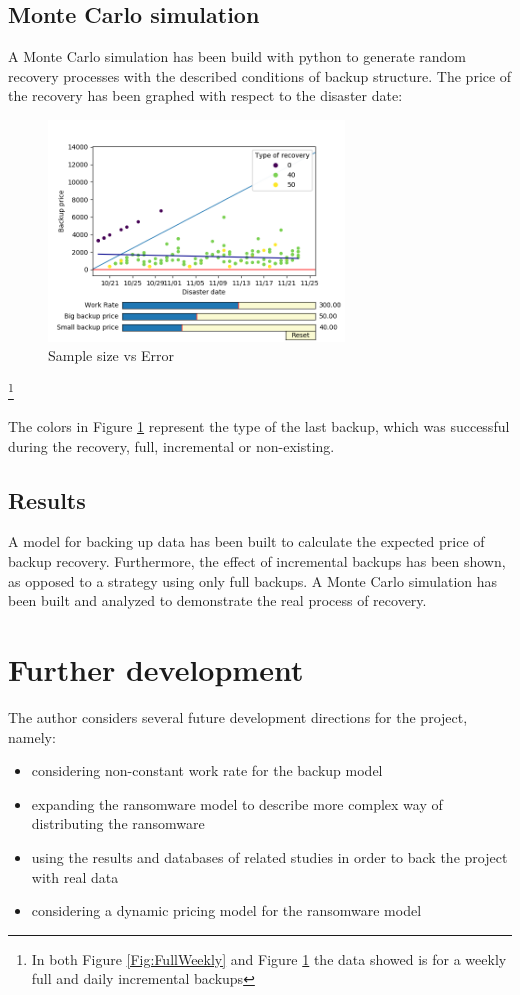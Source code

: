 \documentclass[11pt, a4paper]{article}
\theoremstyle{definition}
\newcommand\blfootnote[1]{%
	\begingroup
	\renewcommand\thefootnote{}\footnote{#1}%
	\addtocounter{footnote}{-1}%
	\endgroup
}
\begin{document}
		\subsection{Monte Carlo simulation}
			A Monte Carlo simulation has been build with python to generate random recovery processes with the described conditions of backup structure. The price of the recovery has been graphed with respect to the disaster date:
			\begin{figure}[H]
				\begin{minipage}{1.0\textwidth}
					\centering
					\includegraphics[width=0.7\textwidth]{"Weekly_full_carlo"}
					\caption{Sample size vs Error}\label{Fig:MonteCarlo}
				\end{minipage}
			\end{figure}
		\blfootnote{In both Figure \ref{Fig:FullWeekly} and Figure \ref{Fig:MonteCarlo} the data showed is for a weekly full and daily incremental backups}
		The colors in Figure \ref{Fig:MonteCarlo} represent the type of the last backup, which was successful during the recovery, full, incremental or non-existing.
		\subsection{Results}
			A model for backing up data has been built to calculate the expected price of backup recovery. Furthermore, the effect of incremental backups has been shown, as opposed to a strategy using only full backups. A Monte Carlo simulation has been built and analyzed to demonstrate the real process of recovery.
\section{Further development}
	The author considers several future development directions for the project, namely:
	\begin{itemize}
		\item considering non-constant work rate for the backup model
		\item expanding the ransomware model to describe more complex way of distributing the ransomware
		\item using the results and databases of related studies in order to back the project with real data\cite{paquet2019ransomware}
		\item considering a dynamic pricing model for the ransomware model
	\end{itemize}
\end{document}
